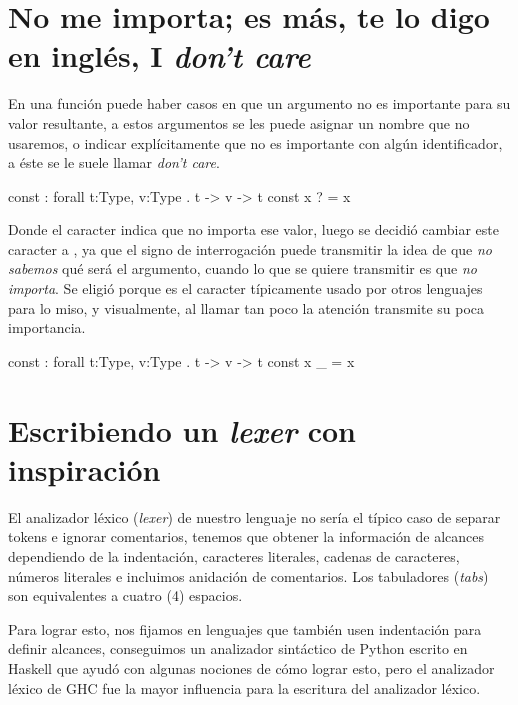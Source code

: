 {\section{No me importa; es más, te lo digo en inglés, I \emph{don't care}}

\begin{designfr}
En una función puede haber casos en que un argumento no es importante para su valor resultante, a estos argumentos se les puede asignar un nombre que no usaremos, o indicar explícitamente que no es importante con algún identificador, a éste se le suele llamar \emph{don't care}.

\begin{anglercode}[alsoletter={?},morekeywords={?}]
const : forall t:Type, v:Type . t -> v -> t
const x ? = x
\end{anglercode}

Donde el caracter  indica que no importa ese valor, luego se decidió cambiar este caracter a \inlinecode{\_}, ya que el signo de interrogación puede transmitir la idea de que \emph{no sabemos} qué será el argumento, cuando lo que se quiere transmitir es que \emph{no importa}. Se eligió \inlinecode{\_} porque es el caracter típicamente usado por otros lenguajes para lo miso, y visualmente, al llamar tan poco la atención transmite su poca importancia.

\begin{anglercode}[morekeywords={\_}]
const : forall t:Type, v:Type . t -> v -> t
const x _ = x
\end{anglercode}
\end{designfr}

\section{Escribiendo un \emph{lexer} con inspiración}

\begin{designfr}
El analizador léxico (\emph{lexer}) de nuestro lenguaje no sería el típico caso de separar tokens e ignorar comentarios, tenemos que obtener la información de alcances dependiendo de la indentación, caracteres literales, cadenas de caracteres, números literales e incluimos anidación de comentarios. Los tabuladores (\emph{tabs}) son equivalentes a cuatro (4) espacios.
\end{designfr}

\begin{investigationfr}
Para lograr esto, nos fijamos en lenguajes que también usen indentación para definir alcances, conseguimos un analizador sintáctico de Python escrito en Haskell \cite{python-parser} que ayudó con algunas nociones de cómo lograr esto, pero el analizador léxico de GHC \cite{ghc} fue la mayor influencia para la escritura del analizador léxico.
\end{investigationfr}

}
